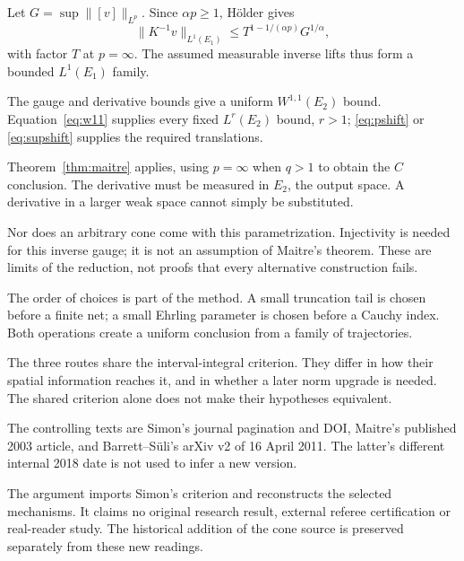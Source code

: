 \documentclass[12pt,reqno]{amsart}
\begin{document}
Let $G=\sup\|[v]\|_{L^p}$. Since $\alpha p\ge1$, H\"older gives
\begin{equation}\label{eq:lift}
\|K^{-1}v\|_{L^1(E_1)}\le T^{1-1/(\alpha p)}G^{1/\alpha},
\end{equation}
with factor $T$ at $p=\infty$. The assumed measurable inverse lifts thus form a bounded $L^1(E_1)$ family.

The gauge and derivative bounds give a uniform $W^{1,1}(E_2)$ bound. Equation~\eqref{eq:w11} supplies every fixed $L^r(E_2)$ bound, $r>1$; \eqref{eq:pshift} or \eqref{eq:supshift} supplies the required translations.

Theorem~\ref{thm:maitre} applies, using $p=\infty$ when $q>1$ to obtain the $C$ conclusion. The derivative must be measured in $E_2$, the output space. A derivative in a larger weak space cannot simply be substituted.

Nor does an arbitrary cone come with this parametrization. Injectivity is needed for this inverse gauge; it is not an assumption of Maitre's theorem. These are limits of the reduction, not proofs that every alternative construction fails.

The order of choices is part of the method. A small truncation tail is chosen before a finite net; a small Ehrling parameter is chosen before a Cauchy index. Both operations create a uniform conclusion from a family of trajectories.

The three routes share the interval-integral criterion. They differ in how their spatial information reaches it, and in whether a later norm upgrade is needed. The shared criterion alone does not make their hypotheses equivalent.

The controlling texts are Simon's journal pagination and DOI, Maitre's published 2003 article, and Barrett--S\"uli's arXiv v2 of 16 April 2011. The latter's different internal 2018 date is not used to infer a new version.

The argument imports Simon's criterion and reconstructs the selected mechanisms. It claims no original research result, external referee certification or real-reader study. The historical addition of the cone source is preserved separately from these new readings.



\end{document}
